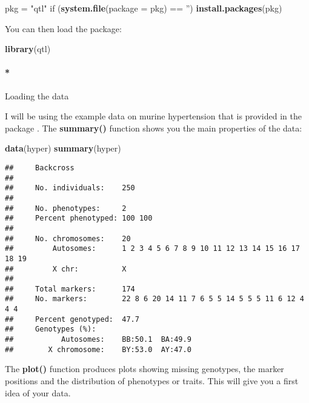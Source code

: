 \documentclass[12pt,]{book}
\newenvironment{Shaded}{\begin{snugshade}}{\end{snugshade}}
\newcommand{\KeywordTok}[1]{\textcolor[rgb]{0.27,0.27,0.27}{\textbf{{#1}}}}
\newcommand{\DataTypeTok}[1]{\textcolor[rgb]{0.27,0.27,0.27}{{#1}}}
\newcommand{\StringTok}[1]{\textcolor[rgb]{0.5,0.5,0.5}{{#1}}}
\newcommand{\NormalTok}[1]{{#1}}
\let\oldparagraph\paragraph
\renewcommand{\paragraph}[1]{\oldparagraph{#1}\mbox{}}
\begin{document}
\begin{Shaded}
\begin{Highlighting}[]
\NormalTok{pkg =}\StringTok{ "qtl"}
\NormalTok{if (}\KeywordTok{system.file}\NormalTok{(}\DataTypeTok{package =} \NormalTok{pkg) ==}\StringTok{ ''}\NormalTok{) }\KeywordTok{install.packages}\NormalTok{(pkg)}
\end{Highlighting}
\end{Shaded}

You can then load the package:

\begin{Shaded}
\begin{Highlighting}[]
\KeywordTok{library}\NormalTok{(qtl)}
\end{Highlighting}
\end{Shaded}

\paragraph*{Loading the data}\label{loading-the-data}

I will be using the example data on murine hypertension that is provided
in the package \citep{Sugiyama200170}. The \textbf{summary()} function
shows you the main properties of the data:

\begin{Shaded}
\begin{Highlighting}[]
\KeywordTok{data}\NormalTok{(hyper)}
\KeywordTok{summary}\NormalTok{(hyper)}
\end{Highlighting}
\end{Shaded}

\begin{verbatim}
##     Backcross
## 
##     No. individuals:    250 
## 
##     No. phenotypes:     2 
##     Percent phenotyped: 100 100 
## 
##     No. chromosomes:    20 
##         Autosomes:      1 2 3 4 5 6 7 8 9 10 11 12 13 14 15 16 17 18 19 
##         X chr:          X 
## 
##     Total markers:      174 
##     No. markers:        22 8 6 20 14 11 7 6 5 5 14 5 5 5 11 6 12 4 4 4 
##     Percent genotyped:  47.7 
##     Genotypes (%):    
##           Autosomes:    BB:50.1  BA:49.9 
##        X chromosome:    BY:53.0  AY:47.0
\end{verbatim}

The \textbf{plot()} function produces plots showing missing genotypes,
the marker positions and the distribution of phenotypes or traits. This
will give you a first idea of your data.
\end{document}
